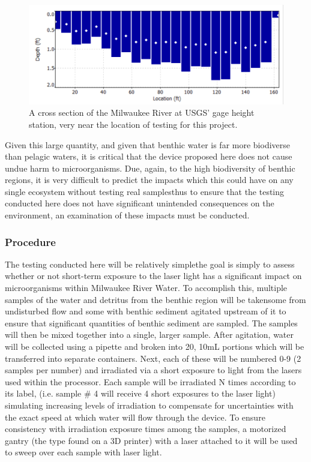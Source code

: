 \documentclass[fleqn,10pt]{SelfArx} %
\begin{document}
	\begin{figure}[h]
		\centering
		\includegraphics[width=1\linewidth]{Figures/RiverCrosssection}
		\caption[River Cross Section]{A cross section of the Milwaukee River at USGS' gage height station, very near the location of testing for this project.}
		\label{fig:riverCrosssec}
	\end{figure}
	
	Given this large quantity, and given that benthic water is far more biodiverse than pelagic waters, it is critical that the device proposed here does not cause undue harm to microorganisms. Due, again, to the high biodiversity of benthic regions, it is very difficult to predict the impacts which this could have on any single ecosystem without testing real samples\textemdash thus to ensure that the testing conducted here does not have significant unintended consequences on the environment, an examination of these impacts must be conducted. 
	
	\subsubsection{Procedure}
	The testing conducted here will be relatively simple\textemdash the goal is simply to assess whether or not short-term exposure to the laser light has a significant impact on microorganisms within Milwaukee River Water. To accomplish this, multiple samples of the water and detritus from the benthic region will be taken\textemdash some from undisturbed flow and some with benthic sediment agitated upstream of it to ensure that significant quantities of benthic sediment are sampled. The samples will then be mixed together into a single, larger sample. After agitation, water will be collected using a pipette and broken into 20, 10mL portions which will be transferred into separate containers. 
	Next, each of these will be numbered 0-9 (2 samples per number) and irradiated via a short exposure to light from the lasers used within the processor. Each sample will be irradiated N times according to its label, (i.e. sample \# 4 will receive 4 short exposures to the laser light) simulating increasing levels of irradiation to compensate for uncertainties with the exact speed at which water will flow through the device. To ensure consistency with irradiation exposure times among the samples, a motorized gantry (the type found on a 3D printer) with a laser attached to it will be used to sweep over each sample with laser light.
	
\end{document}
